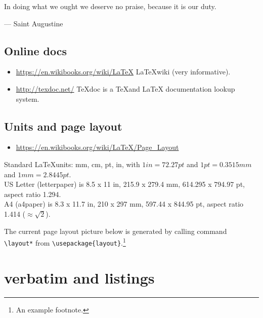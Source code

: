 \documentclass[letterpaper]{article}
\begin{document}
\epigraph
{In doing what we ought we deserve no praise, because it is our duty.}
{--- \textup{Saint Augustine}}

\subsection{Online docs}
\begin{itemize}
    \item \url{https://en.wikibooks.org/wiki/LaTeX} 
          \LaTeX wiki (very informative).
    \item \url{http://texdoc.net/} TeXdoc is a \TeX and \LaTeX
          documentation lookup system.
\end{itemize}

\subsection{Units and page layout}
\begin{itemize}
    \item \url{https://en.wikibooks.org/wiki/LaTeX/Page_Layout}
\end{itemize}
Standard \LaTeX units: mm, cm, pt, in, with $1in = 72.27pt$ and 
$1pt = 0.3515mm$ and $1mm = 2.8445pt$. \\
US Letter (letterpaper) is 8.5 x 11 in, 215.9 x 279.4 mm, 
614.295 x 794.97 pt, aspect ratio 1.294. \\
A4 (a4paper) is 8.3 x 11.7 in, 210 x 297 mm, 597.44 x 844.95 pt, aspect ratio 1.414 
($\approx\sqrt{2}$).

\newpage

The current page layout picture below is generated by calling command\\ 
\verb+\layout*+ from \verb+\usepackage{layout}+.\footnote{An example footnote.} 

\vspace{5mm}

\layout*

\newpage

\section{verbatim and listings}

\end{document}

